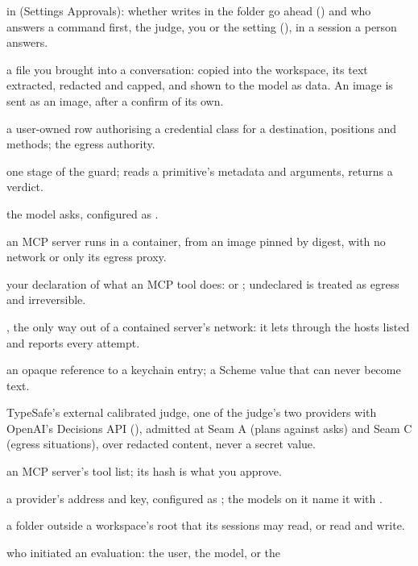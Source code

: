 \begin{description}[leftmargin=2.2em]
\item[approval] \code{[approval]} in  (Settings
  \textrightarrow{} Approvals): whether writes in the folder go ahead
  () and who answers a command first, the judge, you or the
  setting (), in a session a person answers.
\item[attachment] a file you brought into a conversation: copied into the
  workspace, its text extracted, redacted and capped, and shown to the model
  as data. An image is sent as an image, after a confirm of its own.
\item[binding] a user-owned row authorising a credential class for a
  destination, positions and methods; the egress authority.
\item[checker] one stage of the guard; reads a primitive's metadata and
  arguments, returns a verdict.
\item[control model] the model  asks, configured as
  \code{[control]}.
\item[contained server] an MCP server \nodwyn{} runs in a container, from
  an image pinned by digest, with no network or only its egress proxy.
\item[effect] your declaration of what an MCP tool does:  or
  ; undeclared is treated as egress and irreversible.
\item[egress proxy] , the only way out of a contained
  server's network: it lets through the hosts listed and reports every
  attempt.
\item[handle] an opaque reference to a keychain entry; a Scheme value that
  can never become text.
\item[Jev] TypeSafe's external calibrated judge, one of the judge's two
  providers with OpenAI's Decisions API (), admitted at Seam A
  (plans against asks) and Seam C (egress situations), over redacted
  content, never a secret value.
\item[manifest] an MCP server's tool list; its hash is what you approve.
\item[model server] a provider's address and key, configured as
  ; the models on it name it with .
\item[mount] a folder outside a workspace's root that its sessions may
  read, or read and write.
\item[origin] who initiated an evaluation: the user, the model, or the

\end{description}
